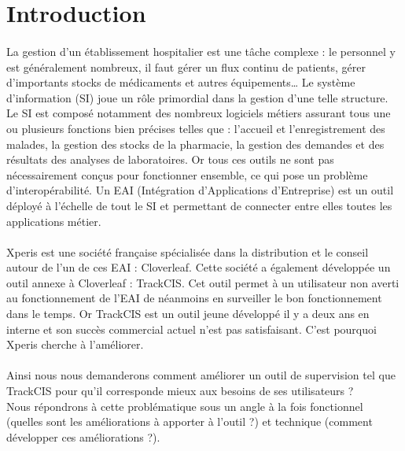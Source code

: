 \section*{Introduction}
	\paragraph{}
	La gestion d'un établissement hospitalier est une tâche complexe :
	le personnel y est généralement nombreux, il faut gérer un flux continu de
	patients, gérer d'importants stocks de médicaments et autres équipements\ldots
	Le système d'information (SI) joue un rôle primordial dans la gestion d'une
	telle structure. Le SI est composé notamment des nombreux logiciels métiers
	assurant tous une ou plusieurs fonctions bien précises telles que : l'accueil
	et l'enregistrement des malades, la gestion des stocks de la pharmacie, la gestion
	des demandes et des résultats des analyses de laboratoires. Or tous ces
	outils ne sont pas nécessairement conçus pour fonctionner ensemble, ce qui
	pose un problème d'interopérabilité. Un EAI (Intégration d'Applications d'Entreprise)
	est un outil déployé à l'échelle de tout le SI et permettant de connecter
	entre elles toutes les applications métier.
	
	\paragraph{}
	Xperis est une société française spécialisée dans la distribution et le conseil
	autour de l'un de ces EAI : Cloverleaf. Cette société a également développée
	un outil annexe à Cloverleaf : TrackCIS. Cet outil permet à un utilisateur non
	averti au fonctionnement de l'EAI de néanmoins en surveiller le bon
	fonctionnement dans le temps. Or TrackCIS est un outil jeune développé il y a
	deux ans en interne et son succès commercial actuel n'est pas satisfaisant.
	C'est pourquoi Xperis cherche à l'améliorer.
	
	\paragraph{}
	Ainsi nous nous demanderons comment améliorer un outil de supervision tel que
	TrackCIS pour qu'il corresponde mieux aux besoins de ses utilisateurs ?\\
	Nous répondrons à cette problématique sous un angle à la fois fonctionnel
	(quelles sont les améliorations à apporter à l'outil ?) et technique (comment
	développer ces améliorations ?).
	
